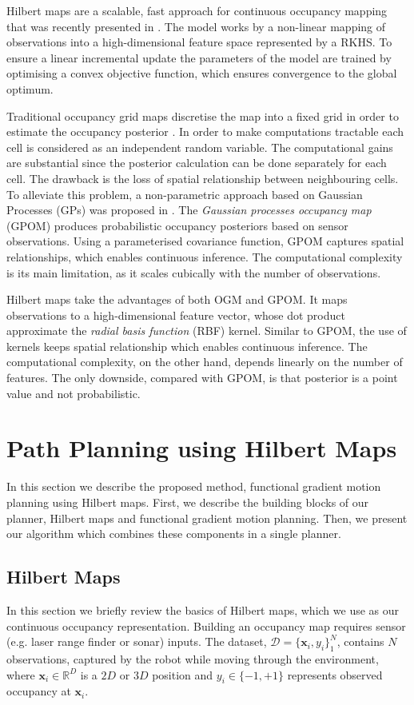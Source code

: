 \documentclass[letterpaper, 10 pt, conference]{ieeeconf}  %
\begin{document}
Hilbert maps are a scalable, fast approach for continuous occupancy mapping that was recently presented in \cite{ramos2015hilbert}. The model works by a non-linear mapping of observations into a high-dimensional feature space represented by a RKHS. To ensure a linear incremental update the parameters of the model are trained by optimising a convex objective function, which ensures convergence to the global optimum. 

Traditional occupancy grid maps discretise the map into a fixed grid in order to estimate the occupancy posterior \cite{Elfes1989}. In order to make computations tractable each cell is considered as an independent random variable. The computational gains are substantial since the posterior calculation can be done separately for each cell. The drawback is the loss of spatial relationship between neighbouring cells. To alleviate this problem, a non-parametric approach based on Gaussian Processes (GPs) was proposed in \cite{OCallaghan2012}. The \textit{Gaussian processes occupancy map} (GPOM) produces probabilistic occupancy posteriors based on sensor observations. Using a parameterised covariance function, GPOM captures spatial relationships, which enables continuous inference. The computational complexity is its main limitation, as it scales cubically with the number of observations.

Hilbert maps take the advantages of both OGM and GPOM. It maps observations to a high-dimensional feature vector, whose dot product approximate the \textit{radial basis function} (RBF) kernel. Similar to GPOM, the use of kernels keeps spatial relationship which enables continuous inference. The computational complexity, on the other hand, depends linearly on the number of features. The only downside, compared with GPOM, is that posterior is a point value and not probabilistic. 


\section{Path Planning using Hilbert Maps}
\label{sec:PathPlanning}
In this section we describe the proposed method, functional gradient motion planning using Hilbert maps. First, we describe the building blocks of our planner, Hilbert maps and functional gradient motion planning. Then, we present our algorithm which combines these components in a single planner.

\subsection{Hilbert Maps} \label{subsec:HilbertMaps}
In this section we briefly review the basics of Hilbert maps, which we use as our continuous occupancy representation. Building an occupancy map requires sensor (e.g. laser range finder or sonar) inputs. The dataset, $\mathcal{D}=\{\boldsymbol{x}_i,y_i\}^N_1$, contains $N$ observations, captured by the robot while moving through the environment, where $\boldsymbol{x}_i \in \mathbb{R}^D$ is a $2D$ or $3D$ position and $y_i \in \{-1,+1\}$ represents observed occupancy at $\boldsymbol{x}_i$.
\end{document}
